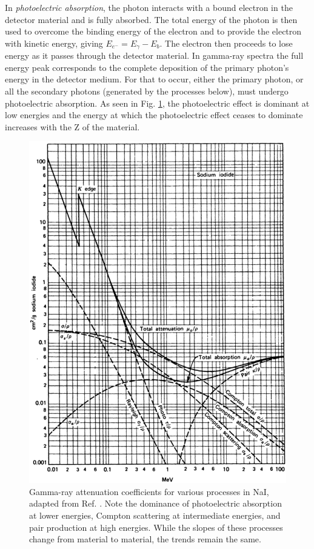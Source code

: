 In \emph{photoelectric absorption}, the photon interacts with a bound electron in the detector material and is fully absorbed\cite{einstein-PE}. The total energy of the photon is then used to overcome the binding energy of the electron and to provide the electron with kinetic energy, giving $E_{e^-}=E_{\gamma}-E_b$. The electron then proceeds to lose energy as it passes through the detector material. In gamma-ray spectra the full energy peak corresponds to the complete deposition of the primary photon's energy in the detector medium. For that to occur, either the primary photon, or all the secondary photons (generated by the processes below), must undergo photoelectric absorption. As seen in Fig. \ref{fig:chp3-gamma-interactions}, the photoelectric effect is dominant at low energies and the energy at which the photoelectric effect ceases to dominate increases with the Z of the material.

\begin{figure}[hb!]
	\centerline{\includegraphics[height=0.7\textheight]{./img/c3/gamma_interactions_scan.eps}}
	\caption{Gamma-ray attenuation coefficients for various processes in NaI, adapted from Ref. \cite{knollBook}. Note the dominance of photoelectric absorption at lower energies, Compton scattering at intermediate energies, and pair production at high energies. While the slopes of these processes change from material to material, the trends remain the same.\label{fig:chp3-gamma-interactions}}
\end{figure}

